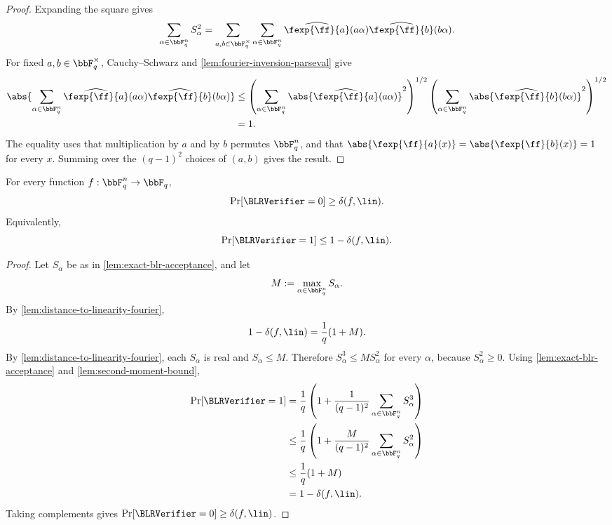 \begin{proof}
Expanding the square gives
\[
    \sum_{\alpha\in\bbF_q^n} S_\alpha^2
    =\sum_{a,b\in\bbF_q^\times}
        \sum_{\alpha\in\bbF_q^n}
        \widehat{\fexp{\ff}{a}}(a\alpha)
        \widehat{\fexp{\ff}{b}}(b\alpha).
\]
For fixed $a,b\in\bbF_q^\times$, Cauchy--Schwarz and
\cref{lem:fourier-inversion-parseval} give
\begin{align*}
\abs{\sum_{\alpha\in\bbF_q^n}
        \widehat{\fexp{\ff}{a}}(a\alpha)
        \widehat{\fexp{\ff}{b}}(b\alpha)}
&\le
\left(\sum_{\alpha\in\bbF_q^n}\abs{\widehat{\fexp{\ff}{a}}(a\alpha)}^2\right)^{1/2}
\left(\sum_{\alpha\in\bbF_q^n}\abs{\widehat{\fexp{\ff}{b}}(b\alpha)}^2\right)^{1/2} \\
&=1.
\end{align*}
The equality uses that multiplication by $a$ and by $b$ permutes $\bbF_q^n$, and that
$\abs{\fexp{\ff}{a}(x)}=\abs{\fexp{\ff}{b}(x)}=1$ for every $x$.
Summing over the $(q-1)^2$ choices of $(a,b)$ gives the result.
\end{proof}

\begin{theorem}
\label{thm:finite-field-blr-soundness}
For every function $f:\bbF_q^n\to\bbF_q$,
\[
    \Pr[\BLRVerifier=0] \ge \delta(f,\lin).
\]
Equivalently,
\[
    \Pr[\BLRVerifier=1] \le 1-\delta(f,\lin).
\]
\end{theorem}

\begin{proof}
Let $S_\alpha$ be as in \cref{lem:exact-blr-acceptance}, and let
\[
    M:=\max_{\alpha\in\bbF_q^n}S_\alpha.
\]
By \cref{lem:distance-to-linearity-fourier},
\[
    1-\delta(f,\lin)=\frac{1}{q}(1+M).
\]
By \cref{lem:distance-to-linearity-fourier}, each $S_\alpha$ is real and $S_\alpha\le M$.
Therefore $S_\alpha^3\le M S_\alpha^2$ for every $\alpha$, because $S_\alpha^2\ge 0$.
Using \cref{lem:exact-blr-acceptance} and \cref{lem:second-moment-bound},
\begin{align*}
    \Pr[\BLRVerifier=1]
    &=\frac{1}{q}\left(1+\frac{1}{(q-1)^2}
        \sum_{\alpha\in\bbF_q^n}S_\alpha^3\right) \\
    &\le \frac{1}{q}\left(1+\frac{M}{(q-1)^2}
        \sum_{\alpha\in\bbF_q^n}S_\alpha^2\right) \\
    &\le \frac{1}{q}(1+M) \\
    &=1-\delta(f,\lin).
\end{align*}
Taking complements gives $\Pr[\BLRVerifier=0]\ge\delta(f,\lin)$.
\end{proof}
